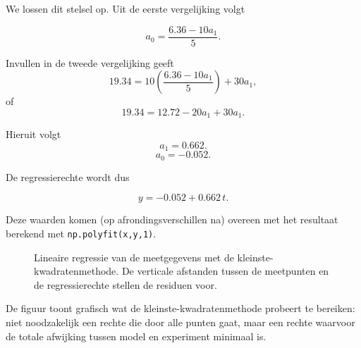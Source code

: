 \documentclass{ximera}
\begin{document}
\begin{example}
We lossen dit stelsel op.
Uit de eerste vergelijking volgt

\[ a_0 = \frac{6.36-10a_1}{5}.\]

Invullen in de tweede vergelijking geeft
\[19.34 = 10\left( \frac{6.36-10a_1}{5}\right)+30a_1,\]
of
\[19.34 = 12.72-20a_1+30a_1.\]

Hieruit volgt
\[a_1 =0.662.\]
\[a_0 = -0.052.\]


De regressierechte wordt dus

\[
\boxed{
y=-0.052+0.662\,t.
}
\]

Deze waarden komen (op afrondingsverschillen na) overeen met het resultaat berekend met \texttt{np.polyfit(x,y,1)}.

\begin{figure}[h!]
\centering
{}
\caption{Lineaire regressie van de meetgegevens met de kleinste-kwadratenmethode. 
De verticale afstanden tussen de meetpunten en de regressierechte stellen de residuen voor.}
\label{fig:kleinste_kwadraten_rechte}
\end{figure}

De figuur toont grafisch wat de kleinste-kwadratenmethode probeert te bereiken:
niet noodzakelijk een rechte die door alle punten gaat, maar een rechte waarvoor
de totale afwijking tussen model en experiment minimaal is.
\end{example}
\end{document}
